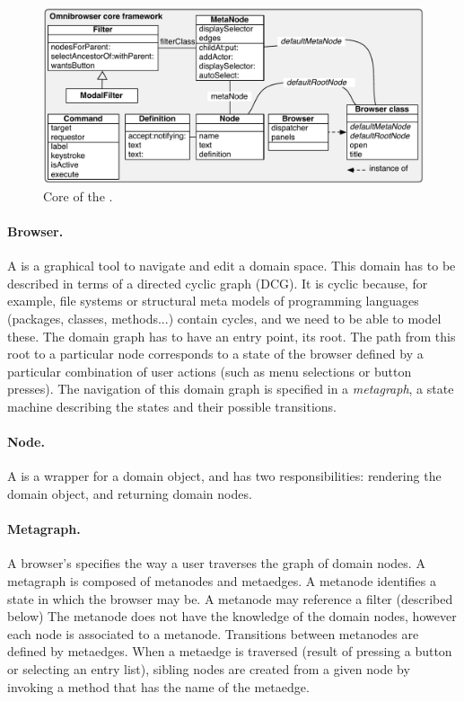 \documentclass[a4paper,10pt,twoside]{book}
\begin{document}
\begin{figure}[!ht]
\begin{center}
\includegraphics[width=\textwidth]{CoreOnly}
\caption{Core of the \obf. } 
\end{center}
\end{figure}

\paragraph{Browser.} A  is a graphical tool to navigate and edit a domain space. This domain has to be described in terms of a directed cyclic graph (DCG). It is cyclic because, for example, file systems or structural meta models of programming languages (\ie packages, classes, methods...) contain cycles, and we need to be able to model these. The domain graph has to have an entry point, its root. The path from this root to a particular node corresponds to a state of the browser defined by a particular combination of user actions (such as menu selections or button presses).
The navigation of this domain graph is specified in a \emph{metagraph}, a state machine describing the states and their possible transitions.

\paragraph{Node.} A  is a wrapper for a domain object, and has two responsibilities: rendering the domain object, and returning domain nodes.

\paragraph{Metagraph.} A browser's  specifies the way a user traverses the graph of domain nodes. A metagraph is composed of metanodes and metaedges. A metanode identifies a state in which the browser may be. A metanode may reference a filter (described below)
The metanode does not have the knowledge of the domain nodes, however each node is associated to a metanode. Transitions between meta\-nodes are defined by metaedges. When a metaedge is traversed (\ie result of pressing a button or selecting an entry list), sibling nodes are created from a given node by invoking a method that has the name of the metaedge.
\end{document}
